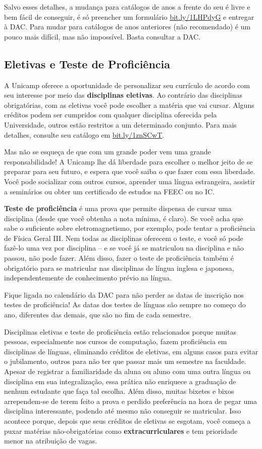 Salvo esses detalhes, a mudança para catálogos de anos a frente do seu é livre
e bem fácil de conseguir, é só preencher um formulário \url{bit.ly/1LHPdyG} e
entregar à DAC. Para mudar para catálogos de anos anteriores (não recomendado)
é um pouco mais difícil, mas não impossível. Basta consultar a DAC.

\subsection{Eletivas e Teste de Proficiência}

A Unicamp oferece a oportunidade de personalizar seu currículo de acordo com
seu interesse por meio das \textbf{disciplinas eletivas}. Ao contrário das
disciplinas obrigatórias, com as eletivas você pode escolher a matéria que vai
cursar. Alguns créditos podem ser cumpridos com qualquer disciplina oferecida
pela Universidade, outros estão restritos a um determinado conjunto. Para mais
detalhes, consulte seu catálogo em \url{bit.ly/1znSCwT}.

Mas não se esqueça de que com um grande poder vem uma grande responsabilidade!
A Unicamp lhe dá liberdade para escolher o melhor jeito de se preparar para seu
futuro, e espera que você saiba o que fazer com essa liberdade. Você pode
socializar com outros cursos, aprender uma língua estrangeira, assistir a
seminários ou obter um certificado de estudos na FEEC ou no IC.

\textbf{Teste de proficiência} é uma prova que permite dispensa de cursar uma
disciplina (desde que você obtenha a nota mínima, é claro). Se você acha que
sabe o suficiente sobre eletromagnetismo, por exemplo, pode tentar a
proficiência de Física Geral III. Nem todas as disciplinas oferecem o teste, e
você só pode fazê-lo uma vez por disciplina -- e se você já se matriculou na
disciplina e não passou, não pode fazer. Além disso, fazer o teste de
proficiência também é obrigatório para se matricular nas disciplinas de língua
inglesa e japonesa, independentemente de conhecimento prévio na língua.

Fique ligada no calendário da DAC para não perder as datas de inscrição nos
testes de proficiência! As datas dos testes de línguas são sempre no começo do
ano, diferentes das demais, que são no fim de cada semestre.

Disciplinas eletivas e teste de proficiência estão relacionados porque muitas
pessoas, especialmente nos cursos de computação, fazem proficiência em
disciplinas de línguas, eliminando créditos de eletivas, em alguns casos para
evitar o jubilamento, outros para não ter que passar mais um semestre na
faculdade. Apesar de registrar a familiaridade da aluna ou aluno com uma outra
língua ou disciplina em sua integralização, essa prática não enriquece a
graduação de nenhum estudante que faça tal escolha. Além disso, muitas bixetes
e bixos arrependem-se de terem feito a prova e perdido preferência na hora de
pegar uma disciplina interessante, podendo até mesmo não conseguir se
matricular. Isso acontece porque, depois que seus créditos de eletivas se
esgotam, você começa a puxar matérias não-obrigatórias como
\textbf{extracurriculares} e tem prioridade menor na atribuição de vagas.

